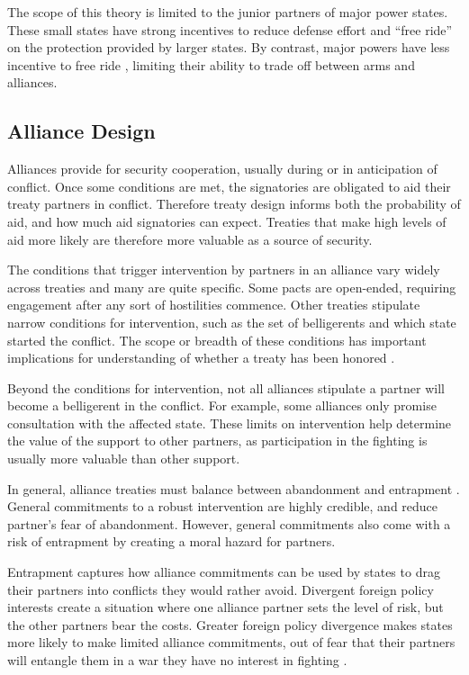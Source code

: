 \documentclass[12pt]{article}
\begin{document}
The scope of this theory is limited to the junior partners of major power states. These small states have strong incentives to reduce defense effort and ``free ride'' on the protection provided by larger states. By contrast, major powers have less incentive to free ride \citep{OlsonZeckhauser1966}, limiting their ability to trade off between arms and alliances. 


\subsection*{Alliance Design}

Alliances provide for security cooperation, usually during or in anticipation of conflict. Once some conditions are met, the signatories are obligated to aid their treaty partners in conflict. Therefore treaty design informs both the probability of aid, and how much aid signatories can expect. Treaties that make high levels of aid more likely are therefore more valuable as a source of security. 

The conditions that trigger intervention by partners in an alliance vary widely across treaties and many are quite specific. Some pacts are open-ended, requiring engagement after any sort of hostilities commence. Other treaties stipulate narrow conditions for intervention, such as the set of belligerents and which state started the conflict. The scope or breadth of these conditions has important implications for understanding of whether a treaty has been honored \citep{Leedsetal2000}. 

Beyond the conditions for intervention, not all alliances stipulate a partner will become a belligerent in the conflict. For example, some alliances only promise consultation with the affected state. These limits on intervention help determine the value of the support to other partners, as participation in the fighting is usually more valuable than other support. 

In general, alliance treaties must balance between abandonment and entrapment \citep{Snyder1984, Benson2012}. General commitments to a robust intervention are highly credible, and reduce partner's fear of abandonment. However, general commitments also come with a risk of entrapment by creating a moral hazard for partners. 

Entrapment captures how alliance commitments can be used by states to drag their partners into conflicts they would rather avoid. Divergent foreign policy interests create a situation where one alliance partner sets the level of risk, but the other partners bear the costs. Greater foreign policy divergence makes states more likely to make limited alliance commitments, out of fear that their partners will entangle them in a war they have no interest in fighting \citep{Benson2012}. 
\end{document}

